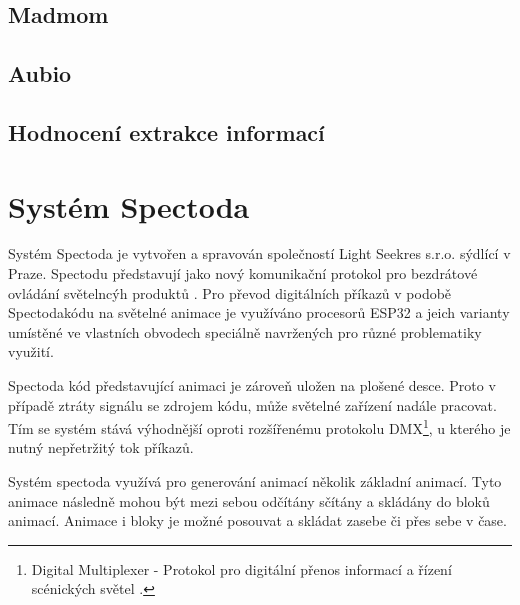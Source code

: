 \subsection{Madmom}
\subsection{Aubio}
\subsection{Hodnocení extrakce informací} \label{sec:Mir_eval}

\section{Systém Spectoda} \label{sec:Spectoda}

Systém Spectoda je vytvořen a spravován společností Light Seekres s.r.o. sýdlící v Praze. Spectodu představují jako nový komunikační protokol pro bezdrátové ovládání světelncýh produktů \cite{Spectoda}. Pro převod digitálních příkazů v podobě Spectodakódu na světelné animace je využíváno procesorů ESP32 a jeich varianty umístěné ve vlastních obvodech speciálně navržených pro různé problematiky využití. 

Spectoda kód představující animaci je zároveň uložen na plošené desce. Proto v případě ztráty signálu se zdrojem kódu, může světelné zařízení nadále pracovat. Tím se systém stává výhodnější oproti rozšířenému protokolu DMX\footnote{Digital Multiplexer - Protokol pro digitální přenos informací a řízení scénických světel \cite{DMX}.}, u kterého je nutný nepřetržitý tok příkazů. 

Systém spectoda využívá pro generování animací několik základní animací. Tyto animace následně mohou být mezi sebou odčítány sčítány a skládány do bloků animací. Animace i bloky je možné posouvat a skládat zasebe či přes sebe v čase.
 
